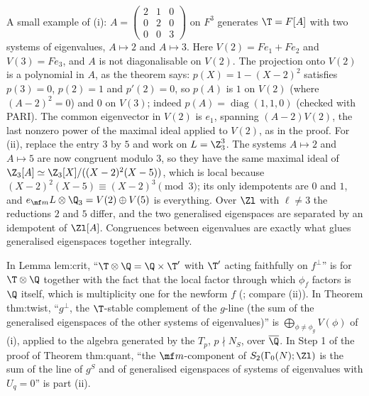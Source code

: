 A small example of (i): $A=\begin{pmatrix}2&1&0\\0&2&0\\0&0&3\end{pmatrix}$ on $F^3$ generates $\T=F[A]$ with two systems of eigenvalues, $A\mapsto2$ and $A\mapsto3$.
Here $V(2)=Fe_1+Fe_2$ and $V(3)=Fe_3$, and $A$ is not diagonalisable on $V(2)$. The projection onto $V(2)$ is a polynomial in $A$, as the theorem
says: $p(X)=1-(X-2)^2$ satisfies $p(3)=0$, $p(2)=1$ and $p'(2)=0$, so $p(A)$ is $1$ on $V(2)$ (where $(A-2)^2=0$) and $0$ on $V(3)$; indeed
$p(A)=\operatorname{diag}(1,1,0)$ (checked with PARI). The common eigenvector in $V(2)$ is $e_1$, spanning $(A-2)V(2)$, the last nonzero power
of the maximal ideal applied to $V(2)$, as in the proof. For (ii), replace the entry $3$ by $5$ and work on $L=\Z_3^3$. The systems
$A\mapsto2$ and $A\mapsto5$ are now congruent modulo $3$, so they have the same maximal ideal of $\Z_3[A]\simeq\Z_3[X]/((X-2)^2(X-5))$, which is
local because $(X-2)^2(X-5)\equiv(X-2)^3\pmod3$; its only idempotents are $0$ and $1$, and $e_{\mf m}L\otimes\Q_3=V(2)\oplus V(5)$ is everything. Over $\Zl$
with $\ell\ne3$ the reductions $2$ and $5$ differ, and the two generalised eigenspaces are separated by an idempotent of $\Zl[A]$. Congruences
between eigenvalues are exactly what glues generalised eigenspaces together integrally.

\begin{paperlink}\label{pl:modules:eigenspaces}
In Lemma lem:crit, ``$\T\otimes\Q=\Q\times\T'$ with $\T'$ acting faithfully on $f^\perp$'' is  for $\T\otimes\Q$ together with the fact
that the local factor through which $\phi_f$ factors is $\Q$ itself, which is multiplicity one for the newform $f$ (; compare
(ii)). In Theorem thm:twist, ``$g^\perp$, the $\T$-stable complement of the $g$-line (the sum of the generalised eigenspaces
of the other systems of eigenvalues)'' is $\bigoplus_{\phi\ne\phi_g}V(\phi)$ of (i), applied to the algebra generated by the $T_p$,
$p\nmid N_S$, over $\overline\Q$. In Step 1 of the proof of Theorem thm:quant, ``the $\mf m$-component of $S_2(\Gamma_0(N);\Zl)$ is the sum of the line of $g^S$ and of
generalised eigenspaces of systems of eigenvalues with $U_q=0$'' is part (ii).
\end{paperlink}

